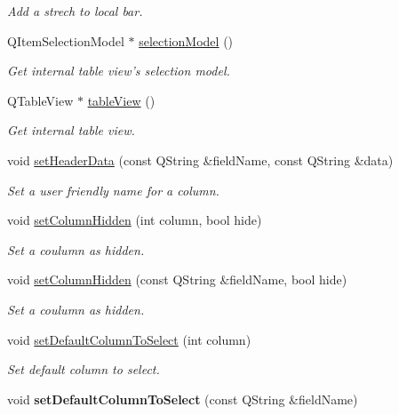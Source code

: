 \begin{DoxyCompactItemize}
\begin{DoxyCompactList}\small\item\em Add a strech to local bar. \end{DoxyCompactList}\item 
\hypertarget{classmdt_sql_table_widget_a47fc691f2cd9cc40749c987ce2bbea6d}{
QItemSelectionModel $\ast$ \hyperlink{classmdt_sql_table_widget_a47fc691f2cd9cc40749c987ce2bbea6d}{selectionModel} ()}
\label{classmdt_sql_table_widget_a47fc691f2cd9cc40749c987ce2bbea6d}

\begin{DoxyCompactList}\small\item\em Get internal table view's selection model. \end{DoxyCompactList}\item 
\hypertarget{classmdt_sql_table_widget_af40eeb001ec262830daba6b311927ede}{
QTableView $\ast$ \hyperlink{classmdt_sql_table_widget_af40eeb001ec262830daba6b311927ede}{tableView} ()}
\label{classmdt_sql_table_widget_af40eeb001ec262830daba6b311927ede}

\begin{DoxyCompactList}\small\item\em Get internal table view. \end{DoxyCompactList}\item 
void \hyperlink{classmdt_sql_table_widget_a591461ee19f22008a5c310609461081e}{setHeaderData} (const QString \&fieldName, const QString \&data)
\begin{DoxyCompactList}\small\item\em Set a user friendly name for a column. \end{DoxyCompactList}\item 
\hypertarget{classmdt_sql_table_widget_a466ff75bee2a0efd99c62994f65a5d18}{
void \hyperlink{classmdt_sql_table_widget_a466ff75bee2a0efd99c62994f65a5d18}{setColumnHidden} (int column, bool hide)}
\label{classmdt_sql_table_widget_a466ff75bee2a0efd99c62994f65a5d18}

\begin{DoxyCompactList}\small\item\em Set a coulumn as hidden. \end{DoxyCompactList}\item 
void \hyperlink{classmdt_sql_table_widget_ae1eefd42d91ea36fa4244d7f265d7222}{setColumnHidden} (const QString \&fieldName, bool hide)
\begin{DoxyCompactList}\small\item\em Set a coulumn as hidden. \end{DoxyCompactList}\item 
void \hyperlink{classmdt_sql_table_widget_a3b3d79485206f7f3468e125e38bd24f9}{setDefaultColumnToSelect} (int column)
\begin{DoxyCompactList}\small\item\em Set default column to select. \end{DoxyCompactList}\item 
\hypertarget{classmdt_sql_table_widget_a17d60fda061030fdfe15be5445eadc76}{
void {\bfseries setDefaultColumnToSelect} (const QString \&fieldName)}
\label{classmdt_sql_table_widget_a17d60fda061030fdfe15be5445eadc76}


\end{DoxyCompactItemize}
